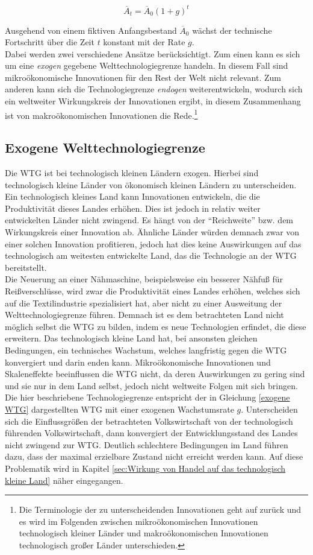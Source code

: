 \begin{equation}
\overline{A}_t=\overline{A}_0(1+g)^t\label{exogene WTG}
\end{equation}

Ausgehend von einem fiktiven Anfangsbestand $\overline{A}_0$ wächst der technische Fortschritt über die Zeit $t$ konstant mit der Rate $g$.\\ 
%
Dabei werden zwei verschiedene Ansätze berücksichtigt. Zum einen kann es sich um eine \textsl{exogen} gegebene Welttechnologiegrenze handeln. In diesem Fall sind mikroökonomische Innovationen für den Rest der Welt nicht relevant. Zum anderen kann sich die Technologiegrenze \textsl{endogen} weiterentwickeln, wodurch sich ein weltweiter Wirkungskreis der Innovationen ergibt, in diesem Zusammenhang ist von makroökonomischen Innovationen die Rede.\footnote{Die Terminologie der zu unterscheidenden Innovationen geht auf \cite{Mokyr.1990} zurück und es wird im Folgenden zwischen mikroökonomischen Innovationen technologisch kleiner Länder und makroökonomischen Innovationen technologisch großer Länder unterschieden.}
%
\subsection{Exogene Welttechnologiegrenze}\label{sec:exogene WTG}
Die WTG ist bei technologisch kleinen Ländern exogen. Hierbei sind technologisch kleine Länder von ökonomisch kleinen Ländern zu unterscheiden. Ein technologisch kleines Land kann Innovationen entwickeln, die die Produktivität dieses Landes erhöhen. Dies ist jedoch in relativ weiter entwickelten Länder nicht zwingend. Es hängt von der "`Reichweite"' bzw. dem Wirkungskreis einer Innovation ab. Ähnliche Länder würden demnach zwar von einer solchen Innovation profitieren, jedoch hat dies keine Auswirkungen auf das technologisch am weitesten entwickelte Land, das die Technologie an der WTG bereitstellt.\\
%
Die Neuerung an einer Nähmaschine, beispielsweise ein besserer Nähfuß für Reißverschlüsse, wird zwar die Produktivität eines Landes erhöhen, welches sich auf die Textilindustrie spezialisiert hat, aber nicht zu einer Ausweitung der Welttechnologiegrenze führen. Demnach ist es dem betrachteten Land nicht möglich selbst die WTG zu bilden, indem es neue Technologien erfindet, die diese erweitern. Das technologisch kleine Land hat, bei ansonsten gleichen Bedingungen, ein technisches Wachstum, welches langfristig gegen die WTG konvergiert und darin enden kann.
Mikroökonomische Innovationen und Skaleneffekte beeinflussen die WTG nicht, da deren Auswirkungen zu gering sind und sie nur in dem Land selbst, jedoch nicht weltweite Folgen mit sich bringen. Die hier beschriebene Technologiegrenze entspricht der in Gleichung \eqref{exogene WTG} dargestellten WTG mit einer exogenen Wachstumsrate $g$. 
Unterscheiden sich die Einflussgrößen der betrachteten Volkswirtschaft von der technologisch führenden Volkswirtschaft, dann konvergiert der Entwicklungsstand des Landes nicht zwingend zur WTG. Deutlich schlechtere Bedingungen im Land führen dazu, dass der maximal erzielbare Zustand nicht erreicht werden kann. Auf diese Problematik wird in Kapitel \ref{sec:Wirkung von Handel auf das technologisch kleine Land} näher eingegangen. 
%
